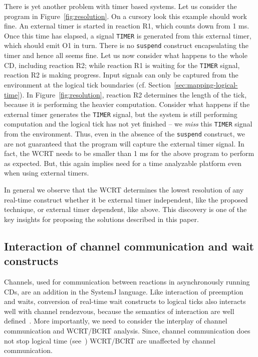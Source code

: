 There is yet another problem with timer based systems. Let us consider
the program in Figure~\ref{fig:resolution}. On a cursory look this
example should work fine. An external timer is started in reaction R1,
which counts down from 1 ms. Once this time has elapsed, a signal
\texttt{TIMER} is generated from this external timer, which should emit
O1 in turn. There is no \texttt{suspend} construct encapsulating the
timer and hence all seems fine. Let us now consider what happens to the
whole CD, including reaction R2; while reaction R1 is waiting for the
\texttt{TIMER} signal, reaction R2 is making progress. Input signals can
only be captured from the environment at the logical tick boundaries
(cf. Section~\ref{sec:mapping-logical-time}). In
Figure~\ref{fig:resolution}, reaction R2 determines the length of the
tick, because it is performing the heavier computation. Consider what
happens if the external timer generates the \texttt{TIMER} signal, but
the system is still performing computation and the logical tick has not
yet finished -- we \textit{miss} this \texttt{TIMER} signal from the
environment. Thus, even in the absence of the \texttt{suspend}
construct, we are not guaranteed that the program will capture the
external timer signal. In fact, the WCRT needs to be smaller than 1 ms
for the above program to perform as expected. But, this again implies
need for a time analyzable platform even when using external timers.

In general we observe that the WCRT determines the lowest resolution of
any real-time construct whether it be external timer independent, like
the proposed technique, or external timer dependent, like above. This
discovery is one of the key insights for proposing the solutions
described in this paper.


\subsection{Interaction of channel communication and wait constructs}
\label{sec:inter-chann-comm}

Channels, used for communication between reactions in asynchronously
running CDs, are an addition in the SystemJ language. Like interaction
of preemption and waits, conversion of real-time wait constructs to
logical ticks also interacts well with channel rendezvous, because the
semantics of interaction are well defined~\cite{amal10}. More
importantly, we need to consider the interplay of channel communication
and WCRT/BCRT analysis. Since, channel communication does not stop
logical time (see~\cite{amal10}) WCRT/BCRT are unaffected by channel
communication. %

